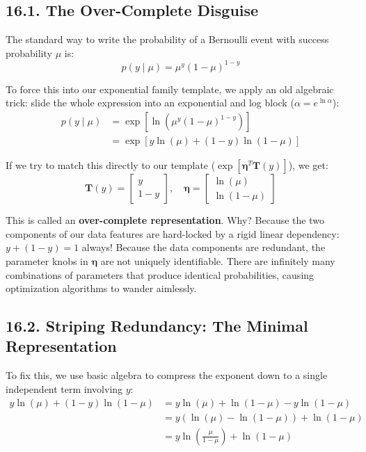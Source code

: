 \documentclass{article}
\begin{document}
\subsection*{16.1. The Over-Complete Disguise}
The standard way to write the probability of a Bernoulli event with success probability $\mu$ is:
\begin{equation}
p(y \mid \mu) = \mu^y (1 - \mu)^{1-y} \tag{79}
\end{equation}

To force this into our exponential family template, we apply an old algebraic trick: slide the whole expression into an exponential and log block ($\alpha = e^{\ln \alpha}$):
\begin{align}
p(y \mid \mu) &= \exp\left[ \ln\left( \mu^y (1 - \mu)^{1-y} \right) \right] \nonumber \\
&= \exp\left[ y \ln(\mu) + (1 - y) \ln(1 - \mu) \right] \tag{80}
\end{align}

If we try to match this directly to our template ($\exp[\boldsymbol{\eta}^T \mathbf{T}(y)]$), we get:
\begin{equation*}
\mathbf{T}(y) = \begin{bmatrix} y \\ 1-y \end{bmatrix}, \quad \boldsymbol{\eta} = \begin{bmatrix} \ln(\mu) \\ \ln(1-\mu) \end{bmatrix}
\end{equation*}

This is called an \textbf{over-complete representation}. Why? Because the two components of our data features are hard-locked by a rigid linear dependency: $y + (1-y) = 1$ always! Because the data components are redundant, the parameter knobs in $\boldsymbol{\eta}$ are not uniquely identifiable. There are infinitely many combinations of parameters that produce identical probabilities, causing optimization algorithms to wander aimlessly.

\subsection*{16.2. Striping Redundancy: The Minimal Representation}
To fix this, we use basic algebra to compress the exponent down to a single independent term involving $y$:
\begin{align}
y \ln(\mu) + (1 - y) \ln(1 - \mu) &= y \ln(\mu) + \ln(1 - \mu) - y \ln(1 - \mu) \nonumber \\
&= y \left( \ln(\mu) - \ln(1 - \mu) \right) + \ln(1 - \mu) \nonumber \\
&= y \ln\left( \frac{\mu}{1 - \mu} \right) + \ln(1 - \mu) \tag{81}
\end{align}
\end{document}
